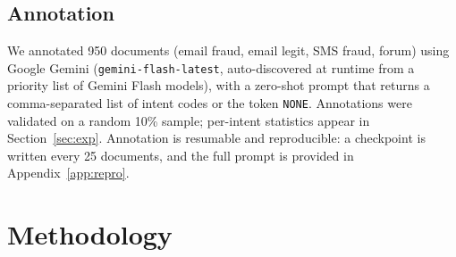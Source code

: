 \documentclass[preprint,12pt,authoryear]{elsarticle}
\begin{document}
\subsection{Annotation}

We annotated 950 documents (email fraud, email legit, SMS fraud,
forum) using Google Gemini
(\texttt{gemini-flash-latest}, auto-discovered at runtime from a
priority list of Gemini Flash models), with a zero-shot prompt that
returns a comma-separated list of intent codes or the token
\texttt{NONE}. Annotations were validated on a random 10\% sample;
per-intent statistics appear in Section~\ref{sec:exp}. Annotation is
resumable and reproducible: a checkpoint is written every 25
documents, and the full prompt is provided in
Appendix~\ref{app:repro}.

\section{Methodology}
\label{sec:method}
\end{document}
